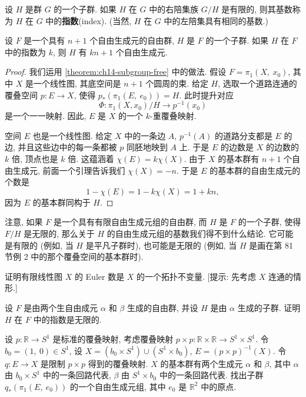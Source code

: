 \begin{definition}[指数]
\label{definition:ch14-index}
设 $H$ 是群 $G$ 的一个子群. 如果 $H$ 在 $G$ 中的右陪集族 $G/H$ 是有限的, 则其基数称为 $H$ 在 $G$ 中的\textbf{指数}(index). (当然, $H$ 在 $G$ 中的左陪集具有相同的基数.)
\end{definition}

\begin{theorem}
\label{theorem:ch14-schreier}
设 $F$ 是一个具有 $n+1$ 个自由生成元的自由群, $H$ 是 $F$ 的一个子群. 如果 $H$ 在 $F$ 中的指数为 $k$, 则 $H$ 有 $kn+1$ 个自由生成元.
\end{theorem}

\begin{proof}
我们运用 \cref{theorem:ch14-subgroup-free} 中的做法. 假设 $F=\pi_{1}(X,\ x_{0})$, 其中 $X$ 是一个线性图, 其底空间是 $n+1$ 个圆周的束. 给定 $H$, 选取一个道路连通的覆叠空间 $p\colon E\to X$, 使得 $p_{*}(\pi_{1}(E,\ e_{0}))=H$. 此时提升对应
\[
\Phi\colon\pi_{1}(X,x_{0})/H\longrightarrow p^{-1}(x_{0})
\]
是一个一一映射. 因此, $E$ 是 $X$ 的一个 $k$-重覆叠映射.

空间 $E$ 也是一个线性图. 给定 $X$ 中的一条边 $A$, $p^{-1}(A)$ 的道路分支都是 $E$ 的边, 并且这些边中的每一条都被 $p$ 同胚地映到 $A$ 上. 于是 $E$ 的边数是 $X$ 的边数的 $k$ 倍, 顶点也是 $k$ 倍. 这蕴涵着 $\chi(E)=k\chi(X)$. 由于 $X$ 的基本群有 $n+1$ 个自由生成元, 前面一个引理告诉我们 $\chi(X)=-n$. 于是 $E$ 的基本群的自由生成元的个数是
\[
1-\chi(E)=1-k\chi(X)=1+kn,
\]
因为 $E$ 的基本群同构于 $H$.
\end{proof}

注意, 如果 $F$ 是一个具有有限自由生成元组的自由群, 而 $H$ 是 $F$ 的一个子群, 使得 $F/H$ 是无限的, 那么关于 $H$ 的自由生成元组的基数我们得不到什么结论. 它可能是有限的 (例如, 当 $H$ 是平凡子群时), 也可能是无限的 (例如, 当 $H$ 是画在第 81 节例 2 中的那个覆叠空间的基本群时).

\begin{exercise}
\label{exercise:ch14-sec85-01}
证明有限线性图 $X$ 的 Euler 数是 $X$ 的一个拓扑不变量. [提示: 先考虑 $X$ 连通的情形.]
\end{exercise}

\begin{exercise}
\label{exercise:ch14-sec85-02}
设 $F$ 是由两个生自由成元 $\alpha$ 和 $\beta$ 生成的自由群, 并设 $H$ 是由 $\alpha$ 生成的子群. 证明 $H$ 在 $F$ 中的指数是无限的.
\end{exercise}

\begin{exercise}
\label{exercise:ch14-sec85-03}
设 $p\colon\mathbb{R}\to S^{1}$ 是标准的覆叠映射, 考虑覆叠映射 $p\times p\colon\mathbb{R}\times\mathbb{R}\to S^{1}\times S^{1}$. 令 $b_{0}=(1,\ 0)\in S^{1}$, 设 $X=(b_{0}\times S^{1})\cup(S^{1}\times b_{0})$, $E=(p\times p)^{-1}(X)$. 令 $q\colon E\to X$ 是限制 $p\times p$ 得到的覆叠映射. $X$ 的基本群有两个生成元 $\alpha$ 和 $\beta$, 其中 $\alpha$ 由 $b_{0}\times S^{1}$ 中的一条回路代表, $\beta$ 由 $S^{1}\times b_{0}$ 中的一条回路代表. 找出子群 $q_{*}(\pi_{1}(E,\ e_{0}))$ 的一个自由生成元组, 其中 $e_{0}$ 是 $\mathbb{R}^{2}$ 中的原点.
\end{exercise}
